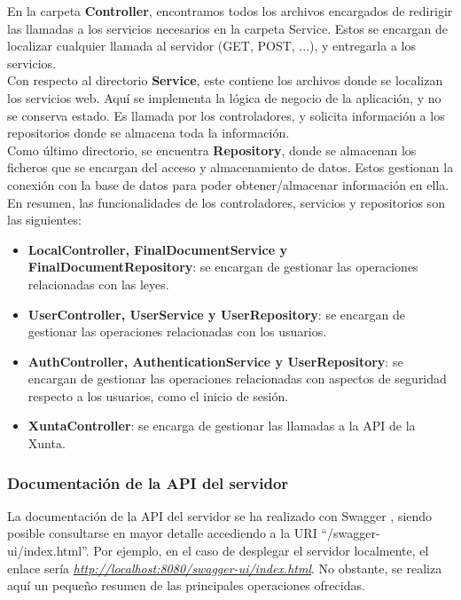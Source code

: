 En la carpeta {\bf Controller}, encontramos todos los archivos encargados de redirigir las llamadas a los servicios necesarios en la carpeta Service. Estos se encargan de localizar cualquier llamada al servidor (GET, POST, ...), y entregarla a los servicios.
\\

Con respecto al directorio {\bf Service}, este contiene los archivos donde se localizan los servicios web. Aquí se implementa la lógica de negocio de la aplicación, y no se conserva estado. Es llamada por los controladores, y solicita información a los repositorios donde se almacena toda la información.
\\

Como último directorio, se encuentra {\bf Repository}, donde se almacenan los ficheros que se encargan del acceso y almacenamiento de datos. Estos gestionan la conexión con la base de datos para poder obtener/almacenar información en ella.
\\

En resumen, las funcionalidades de los controladores, servicios y repositorios son las siguientes:
\begin{itemize}
    \item {\bf LocalController, FinalDocumentService y FinalDocumentRepository}: se encargan de gestionar las operaciones relacionadas con las leyes.
    \item {\bf UserController, UserService y UserRepository}: se encargan de gestionar las operaciones relacionadas con los usuarios.
    \item {\bf AuthController, AuthenticationService y UserRepository}: se encargan de gestionar las operaciones relacionadas con aspectos de seguridad respecto a los usuarios, como el inicio de sesión.
    \item {\bf XuntaController}: se encarga de gestionar las llamadas a la API de la Xunta.
\end{itemize}

\subsubsection{Documentación de la API del servidor}

La documentación de la API del servidor se ha realizado con Swagger \cite{swagger}, siendo posible consultarse en mayor detalle accediendo a la URI ``/swagger-ui/index.html''. Por ejemplo, en el caso de desplegar el servidor localmente, el enlace sería {\it \url{http://localhost:8080/swagger-ui/index.html}}. No obstante, se realiza aquí un pequeño resumen de las principales operaciones ofrecidas.

